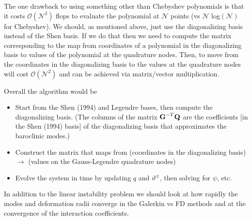 \documentclass[10pt]{article}
\newcommand{\sN}{\mathcal{N}}
\newcommand{\mat}[1]{\text{\bf #1}}
\begin{document}
The one drawback to using something other than Chebyshev polynomials is that it costs $\mathcal{O}(\sN^2)$ flops to evaluate the polynomial at $\sN$ points (vs $\sN$ log$(\sN)$ for Chebyshev).
We should, as mentioned above, just use the diagonalizing basis instead of the Shen basis.
If we do that then we need to compute the matrix corresponding to the map from coordinates of a polynomial in the diagonalizing basis to values of the polynomial at the quadrature nodes.
Then, to move from the coordinates in the diagonalizing basis to the values at the quadrature nodes will cost $\mathcal{O}(\sN^2)$ and can be achieved via matrix/vector multiplication.

Overall the algorithm would be 
\begin{itemize}
\item Start from the Shen (1994) and Legendre bases, then compute the diagonalizing basis. (The columns of the matrix $\mat{G}^{-T}\mat{Q}$ are the coefficients [in the Shen (1994) basis] of the diagonalizing basis that approximates the baroclinic modes.)
\item Construct the matrix that maps from (coordinates in the diagonalizing basis) $\to $ (values on the Gauss-Legendre quadrature nodes)
\item Evolve the system in time by updating $q$ and $\vartheta^\pm$, then solving for $\psi$, etc.
\end{itemize}

In addition to the linear instability problem we should look at how rapidly the modes and deformation radii converge in the Galerkin vs FD methods and at the convergence of the interaction coefficients.\\
\end{document}
